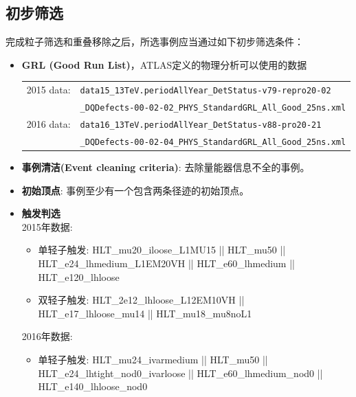 \subsection{初步筛选}
完成粒子筛选和重叠移除之后，所选事例应当通过如下初步筛选条件：
\begin{itemize}
  \item \textbf{GRL (Good Run List)}，ATLAS定义的物理分析可以使用的数据 \\
	\begin{tabular}{ll}
    2015 data: & {\tt data15\_13TeV.periodAllYear\_DetStatus-v79-repro20-02} \\
                      & {\tt \_DQDefects-00-02-02\_PHYS\_StandardGRL\_All\_Good\_25ns.xml} \\
   2016 data: & {\tt data16\_13TeV.periodAllYear\_DetStatus-v88-pro20-21} \\
                    & {\tt \_DQDefects-00-02-04\_PHYS\_StandardGRL\_All\_Good\_25ns.xml} \\
  \end{tabular}
  \item \textbf{事例清洁(Event cleaning criteria)}: 去除量能器信息不全的事例。%
  \item \textbf{初始顶点}: 事例至少有一个包含两条径迹的初始顶点。%
  \item \textbf{触发判选} \\
   2015年数据:
    \begin{itemize}
     \item 单轻子触发: HLT\_mu20\_iloose\_L1MU15 || HLT\_mu50 || HLT\_e24\_lhmedium\_L1EM20VH ||
     HLT\_e60\_lhmedium || HLT\_e120\_lhloose 
     \item 双轻子触发: HLT\_2e12\_lhloose\_L12EM10VH || HLT\_e17\_lhloose\_mu14 || HLT\_mu18\_mu8noL1
    \end{itemize}
  2016年数据:
  \begin{itemize}
    \item 单轻子触发: HLT\_mu24\_ivarmedium || HLT\_mu50 || HLT\_e24\_lhtight\_nod0\_ivarloose ||
      HLT\_e60\_lhmedium\_nod0 || HLT\_e140\_lhloose\_nod0  

\end{itemize}
\end{itemize}
